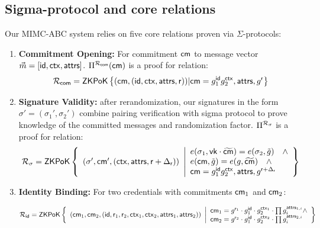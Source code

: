 \subsection{Sigma-protocol and core relations}

Our MIMC-ABC system relies on five core relations proven via $\Sigma$-protocols:
\begin{enumerate}
    \item \textbf{Commitment Opening:} For commitment $\mathsf{cm}$ to message vector $\vec{m} = [\mathsf{id}, \mathsf{ctx}, \mathsf{attrs}]$. $\Pi^{\mathcal{R}_{\mathsf{com}}}(\mathsf{cm})$ is a proof for relation:
    \[
     {\mathcal{R}_{\mathsf{com}}} = {\mathsf{ZKPoK}} \left\{(\mathsf{cm}, (\mathsf{id}, \mathsf{ctx}, \mathsf{attrs}, \mathsf{r}))| \mathsf{cm} = g_1^{\mathsf{id}}g_2^{\mathsf{ctx}},\mathsf{attrs}, g^{\mathsf{r}} \right\}
    \]
    
    \item \textbf{Signature Validity:} after rerandomization, our signatures in the form $\sigma' = (\sigma_1', \sigma_2')$ combine pairing verification with sigma protocol to prove knowledge of the committed messages and randomization factor. $\Pi^{\mathcal{R}_{\sigma}}$ is a proof for relation:
         \[
    {\mathcal{R}_{\sigma}} = {\mathsf{ZKPoK}} \left\{ 
    \begin{array}{l} 
    (\sigma', \mathsf{cm}', (\mathsf{ctx}, \mathsf{attrs}, \mathsf{r} + \Delta_{\mathsf{r}})) \\
    \end{array} 
    \middle|
    \begin{array}{l}
    e(\sigma_1, \mathsf{vk} \cdot \widetilde{\mathsf{cm}}) = e(\sigma_2, \tilde{g}) \quad \wedge \\
    e(\mathsf{cm}, \tilde{g}) = e(g, \widetilde{\mathsf{cm}}) \quad \wedge\\
    \mathsf{cm} = g_1^{\mathsf{id}}g_2^{\mathsf{ctx}},\mathsf{attrs}, g^{\mathsf{r} + \Delta_{\mathsf{r}}} \\
    \end{array} 
    \right\}
    \]


    \item \textbf{Identity Binding:} For two credentials with commitments $\mathsf{cm}_1$ and $\mathsf{cm}_2$:

    \[
    {\mathcal{R}_{\mathsf{id}}} = {\mathsf{ZKPoK}} \left\{ 
    \begin{array}{l} 
    (\mathsf{cm}_1, \mathsf{cm}_2, (\mathsf{id}, \mathsf{r}_1, \mathsf{r}_2, \mathsf{ctx}_1, \mathsf{ctx}_2, \mathsf{attrs}_1, \mathsf{attrs}_2)) \\
    \end{array} 
    \middle|
    \begin{array}{l}
    \mathsf{cm}_1 = g^{\mathsf{r}_1} \cdot g_1^{\mathsf{id}} \cdot g_2^{\mathsf{ctx}_1} \cdot \prod g_i^{\mathsf{attrs}_{1,i}} \wedge \\
     \mathsf{cm}_2 = g^{\mathsf{r}_2} \cdot g_1^{\mathsf{id}} \cdot g_2^{\mathsf{ctx}_2} \cdot \prod g_i^{\mathsf{attrs}_{2,i}} \\
    \end{array} 
    \right\}
    \]
    

\end{enumerate}
